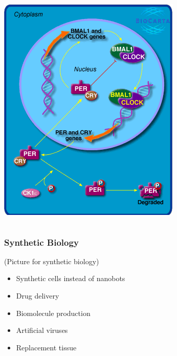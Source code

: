 \documentclass[xcolor={usenames,dvipsnames,svgnames}]{beamer}
\begin{document}
\begin{frame}
\begin{columns}[c]
\begin{column}[c]{0.3\textwidth}
            \includegraphics[width=\textwidth]{h_circadianPathway.png} \footnotesize{\cite{biocarta}}
        \end{column}
    \end{columns}
    \vspace{1.5cm}
\end{frame}

\begin{frame}
    \frametitle{Synthetic Biology}

    (Picture for synthetic biology)

    \begin{itemize}
        \item Synthetic cells instead of nanobots
        \item Drug delivery
        \item Biomolecule production
        \item Artificial viruses
        \item Replacement tissue
    \end{itemize}
\end{frame}
\end{document}
